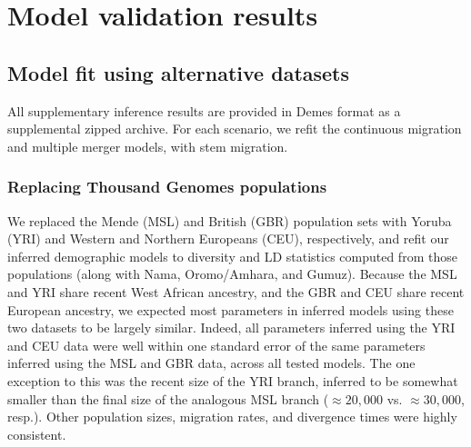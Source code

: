 \documentclass[]{article}
\begin{document}
\section{Model validation results}\label{sec:supp-results}
\label{sec:validation_results}
\subsection{Model fit using alternative datasets}
\label{sec:supp-alt-data}

All supplementary inference results are provided in Demes format
\citep{Gower2022-yn} as a supplemental zipped archive. For each scenario, we
refit the continuous migration and multiple merger models, with stem migration.

\subsubsection{Replacing Thousand Genomes populations}
\label{sec:replacing}
We replaced the Mende (MSL) and British (GBR) population sets with Yoruba (YRI)
and Western and Northern Europeans (CEU), respectively, and refit our inferred
demographic models to diversity and LD statistics computed from those
populations (along with Nama, Oromo/Amhara, and Gumuz). Because the MSL and YRI
share recent West African ancestry, and the GBR and CEU share recent European
ancestry, we expected most parameters in inferred models using these two
datasets to be largely similar. Indeed, all parameters inferred using the YRI
and CEU data were well within one standard error of the same parameters
inferred using the MSL and GBR data, across all tested models. The one
exception to this was the recent size of the YRI branch, inferred to be
somewhat smaller than the final size of the analogous MSL branch ($\approx
20,000$ vs. $\approx 30,000$, resp.). Other population sizes, migration rates,
and divergence times were highly consistent.
\end{document}
